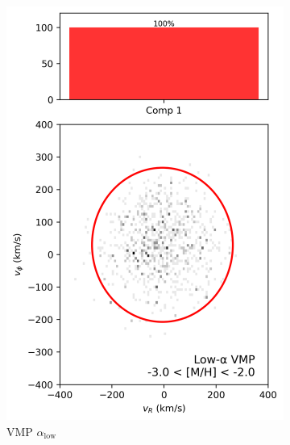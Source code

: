 \documentclass[a4paper,10pt]{article}
\begin{document}
\begin{multicols}{2}
\begin{figure}[H]
  \begin{subfigure}[t]{0.24\linewidth}
    \includegraphics[width=\linewidth]{../figures/gmm_vmp_low_alpha_k1.png}
    \caption{VMP $\alpha_{\mathrm{low}}$}
  \end{subfigure}
  \hfill
  \begin{subfigure}[t]{0.24\linewidth}

\end{subfigure}
\end{figure}
\end{multicols}
\end{document}
